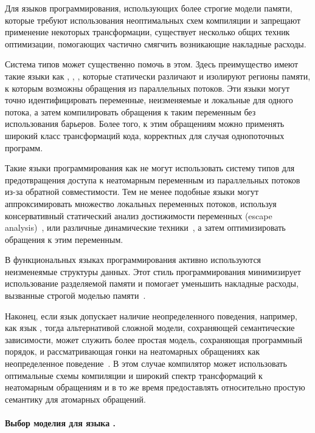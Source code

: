 Для языков программирования, использующих более строгие модели памяти, 
которые требуют использования неоптимальных схем компиляции 
и запрещают применение некоторых трансформации, 
существует несколько общих техник оптимизации, 
помогающих частично смягчить возникающие накладные расходы. 

Система типов может существенно помочь в этом. 
Здесь преимущество имеют такие языки как \Haskell, \OCaml, \Rust, 
которые статически различают и изолируют регионы памяти, 
к которым возможны обращения из параллельных потоков. 
Эти языки могут точно идентифицировать переменные, неизменяемые и локальные для одного потока, 
а затем компилировать обращения к таким переменным без использования барьеров. 
Более того, к этим обращениям можно применять широкий класс трансформаций кода, 
корректных для случая однопоточных программ.
 
Такие языки программирования как  \Java не могут
использовать систему типов для предотвращения 
доступа к неатомарным переменным из параллельных потоков
из-за обратной совместимости.
Тем не менее подобные языки
могут аппроксимировать множество локальных переменных потоков,  используя консервативный 
статический анализ достижимости переменных 
(escape analysis)~\cite{Choi-al:OOPSLA1999}, 
или различные динамические техники~\cite{Liu-al:PLDI19},
а затем оптимизировать обращения к этим переменным.  

В функциональных языках программирования активно используются  неизменеямые структуры данных. 
Этот стиль программирования минимизирует 
использование разделяемой памяти и помогает 
уменьшить накладные расходы, вызванные 
строгой моделью памяти~\cite{Vollmer-al:PPoPP17}.  

Наконец, если язык допускает наличие неопределенного поведения, 
например, как язык \CPP, тогда альтернативой сложной модели, 
сохраняющей семантические зависимости, 
может служить более простая модель, сохраняющая программный порядок, 
и рассматривающая гонки на неатомарных обращениях как 
неопределенное поведение~\cite{Boehm-Demsky:MSPC14, Ou-Demsky:OOPSLA18}.
В этом случае компилятор может использовать оптимальные 
схемы компиляции и широкий спектр трансформаций к неатомарным обращениям
и в то же время предоставлять относительно простую семантику для атомарных обращений. 

\paragraph{Выбор моделия для языка \Kotlin.}

